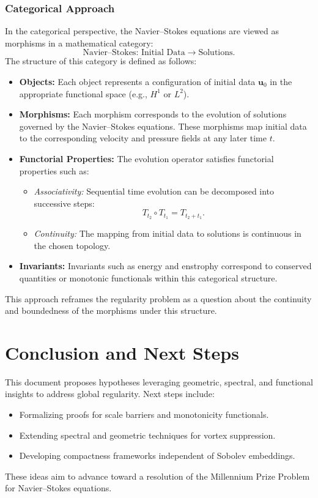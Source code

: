 \subsubsection{Categorical Approach}
In the categorical perspective, the Navier--Stokes equations are viewed as morphisms in a mathematical category:
\[
\text{Navier--Stokes: Initial Data} \to \text{Solutions}.
\]
The structure of this category is defined as follows:
\begin{itemize}
    \item \textbf{Objects:} Each object represents a configuration of initial data $\mathbf{u}_0$ in the appropriate functional space (e.g., $H^1$ or $L^2$).
    \item \textbf{Morphisms:} Each morphism corresponds to the evolution of solutions governed by the Navier--Stokes equations. These morphisms map initial data to the corresponding velocity and pressure fields at any later time $t$.
    \item \textbf{Functorial Properties:} The evolution operator satisfies functorial properties such as:
    \begin{itemize}
        \item \emph{Associativity:} Sequential time evolution can be decomposed into successive steps:
        \[
        T_{t_2} \circ T_{t_1} = T_{t_2 + t_1}.
        \]
        \item \emph{Continuity:} The mapping from initial data to solutions is continuous in the chosen topology.
    \end{itemize}
    \item \textbf{Invariants:} Invariants such as energy and enstrophy correspond to conserved quantities or monotonic functionals within this categorical structure.
\end{itemize}

This approach reframes the regularity problem as a question about the continuity and boundedness of the morphisms under this structure.

\section{Conclusion and Next Steps}
This document proposes hypotheses leveraging geometric, spectral, and functional insights to address global regularity. Next steps include:
\begin{itemize}
    \item Formalizing proofs for scale barriers and monotonicity functionals.
    \item Extending spectral and geometric techniques for vortex suppression.
    \item Developing compactness frameworks independent of Sobolev embeddings.
\end{itemize}
These ideas aim to advance toward a resolution of the Millennium Prize Problem for Navier--Stokes equations.

